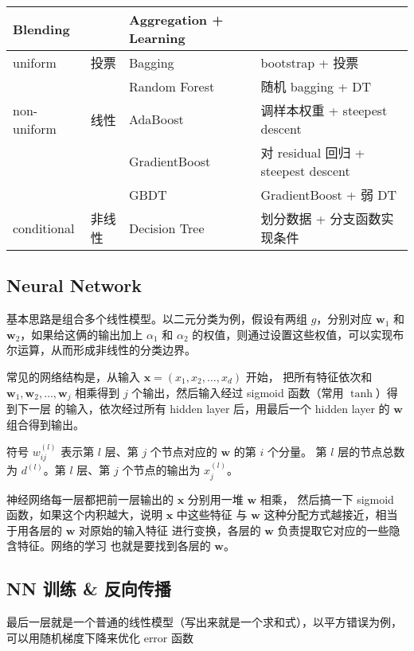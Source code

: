 \documentclass[a4paper]{article}
\begin{document}
\begin{tabular}{p{2cm}|p{1cm}|p{3cm}|p{5cm}}
\hline
Blending & & Aggregation + Learning & \\
\hline
\hline
uniform      & 投票       & Bagging       & bootstrap + 投票 \\
\hline
             &            & Random Forest & 随机 bagging + DT \\
\hline
\hline
non-uniform  & 线性       & AdaBoost      & 调样本权重 + steepest descent \\
\hline
             &            & GradientBoost & 对 residual 回归 + steepest descent \\
\hline
             &            & GBDT          & GradientBoost + 弱 DT \\
\hline
\hline
conditional  & 非线性     & Decision Tree & 划分数据 + 分支函数实现条件 \\
\hline
\end{tabular}

\subsection{Neural Network}
基本思路是组合多个线性模型。以二元分类为例，假设有两组 $g$，分别对应
$\mathbf{w}_1$ 和 $\mathbf{w}_2$，如果给这俩的输出加上 $\alpha_1$ 和
$\alpha_2$ 的权值，则通过设置这些权值，可以实现布尔运算，从而形成非线性的分类边界。

常见的网络结构是，从输入 $\mathbf{x} = (x_1, x_2, \dots, x_d)$ 开始，
把所有特征依次和 $\mathbf{w}_1, \mathbf{w}_2, \dots, \mathbf{w}_j$
相乘得到 $j$ 个输出，然后输入经过 sigmoid 函数（常用 $\tanh$）得到下一层
的输入，依次经过所有 hidden layer 后，用最后一个 hidden layer 的 $\mathbf{w}$
组合得到输出。

符号 $w_{ij}^{(l)}$ 表示第 $l$ 层、第 $j$ 个节点对应的 $\mathbf{w}$ 的第 $i$ 个分量。
第 $l$ 层的节点总数为 $d^{(l)}$。第 $l$ 层、第 $j$ 个节点的输出为 $x_j^{(l)}$。

神经网络每一层都把前一层输出的 $\mathbf{x}$ 分别用一堆 $\mathbf{w}$ 相乘，
然后搞一下 sigmoid 函数，如果这个内积越大，说明 $\mathbf{x}$ 中这些特征
与 $\mathbf{w}$ 这种分配方式越接近，相当于用各层的 $\mathbf{w}$ 对原始的输入特征
进行变换，各层的 $\mathbf{w}$ 负责提取它对应的一些隐含特征。网络的学习
也就是要找到各层的 $\mathbf{w}$。

\subsection{NN 训练 \& 反向传播}
最后一层就是一个普通的线性模型（写出来就是一个求和式），以平方错误为例，
可以用随机梯度下降来优化 error 函数
\end{document}
